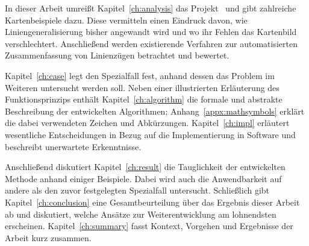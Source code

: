 \documentclass[../main/thesis.tex]{subfiles}
\begin{document}
In dieser Arbeit umreißt Kapitel~\ref{ch:analysis} das Projekt \osm\ und gibt zahlreiche Kartenbeispiele dazu.
Diese vermitteln einen Eindruck davon, wie Liniengeneralisierung bisher angewandt wird und wo ihr Fehlen das Kartenbild verschlechtert.
Anschließend werden existierende Verfahren zur automatisierten Zusammenfassung von Linienzügen betrachtet und bewertet.

Kapitel~\ref{ch:case} legt den Spezialfall fest, anhand dessen das Problem im Weiteren untersucht werden soll.
Neben einer illustrierten Erläuterung des Funktionsprinzips enthält Kapitel~\ref{ch:algorithm} die formale und abstrakte Beschreibung der entwickelten Algorithmen;
Anhang~\ref{appx:mathsymbols} erklärt die dabei verwendeten Zeichen und Abkürzungen.
Kapitel~\ref{ch:impl} erläutert wesentliche Entscheidungen in Bezug auf die Implementierung in Software und beschreibt unerwartete Erkenntnisse.

Anschließend diskutiert Kapitel~\ref{ch:result} die Tauglichkeit der entwickelten Methode anhand einiger Beispiele.
Dabei wird auch die Anwendbarkeit auf andere als den zuvor festgelegten Spezialfall untersucht.
Schließlich gibt Kapitel~\ref{ch:conclusion} eine Gesamtbeurteilung über das Ergebnis dieser Arbeit ab und diskutiert, welche Ansätze zur Weiterentwicklung am lohnendsten erscheinen.
Kapitel~\ref{ch:summary} fasst Kontext, Vorgehen und Ergebnisse der Arbeit kurz zusammen.
\end{document}
